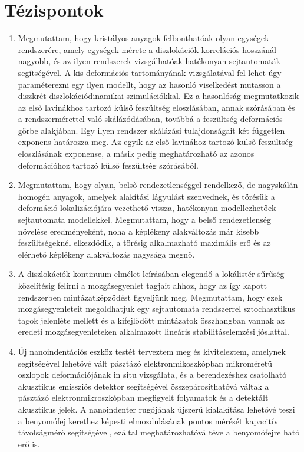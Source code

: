 \section*{Tézispontok}
\begin{enumerate}
\item Megmutattam, hogy kristályos anyagok felbonthatóak olyan egységek rendszerére, amely egységek mérete a diszlokációk korrelációs hosszánál nagyobb, és az ilyen rendszerek vizsgálhatóak hatékonyan sejtautomaták segítségével. A kis deformációs tartományának vizsgálatával fel lehet úgy paraméterezni egy ilyen modellt, hogy az hasonló viselkedést mutasson a diszkrét diszlokációdinamikai szimulációkkal. Ez a hasonlóság megmutatkozik az első lavinákhoz tartozó külső feszültség eloszlásában, annak szórásában és a rendszermérettel való skálázódásában, továbbá a feszültség-deformációs görbe alakjában. Egy ilyen rendszer skálázási tulajdonságait két független exponens határozza meg. Az egyik az első lavinához tartozó külső feszültség eloszlásának exponense, a másik pedig meghatározható az azonos deformációhoz tartozó külső feszültség szórásából. \cite{PhysRevB.95.054108}

\item Megmutattam, hogy olyan, belső rendezetlenséggel rendelkező, de nagyskálán homogén anyagok, amelyek alakítási lágyulást szenvednek, és törésük a deformáció lokalizációjára vezethető vissza, hatékonyan modellezhetőek sejtautomata modellekkel. Megmutattam, hogy a belső rendezetlenség növelése eredményeként, noha a képlékeny alakváltozás már kisebb feszültségeknél elkezdődik, a törésig alkalmazható maximális erő és az elérhető képlékeny alakváltozás nagysága megnő. \cite{Tuzes2017}

\item A diszlokációk kontinuum-elmélet leírásában elegendő a lokálistér-sűrűség közelítésig felírni a mozgásegyenlet tagjait ahhoz, hogy az így kapott rendszerben mintázatképződést figyeljünk meg. Megmutattam, hogy ezek mozgásegyenleteit megoldhatjuk egy sejtautomata rendszerrel sztochasztikus tagok jelenléte mellett és a kifejlődött mintázatok összhangban vannak az eredeti mozgásegyenleteken alkalmazott lineáris stabilitáselemzési jóslattal. \cite{PhysRevB.98.054110}

\item Új nanoindentációs eszköz testét terveztem meg és kiviteleztem, amelynek segítségével lehetővé vált pásztázó elektronmikoszkópban mikroméretű oszlopok deformációjának in situ vizsgálata, és a berendezéshez csatolható akusztikus emissziós detektor segítségével összepárosíthatóvá váltak a pásztázó elektronmikroszkópban megfigyelt folyamatok és a detektált akusztikus jelek. A nanoindenter rugójának újszerű kialakítása lehetővé teszi a benyomófej kerethez képesti elmozdulásának pontos mérését kapacitív távolságmérő segítségével, ezáltal meghatározhatóvá téve a benyomófejre ható erő is. \cite{hegyi}
\end{enumerate}

